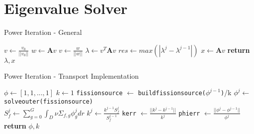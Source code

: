 \section{Eigenvalue Solver}
\begin{algorithm}
\caption{Power Iteration - General}
\begin{algorithmic}
    \State $v \gets \frac{v_0}{||v_0||}$ 
     
        \State $w \gets \textbf{A}v$
        \State $v \gets \frac{w}{|| w||}$
        \State $\lambda \gets v^T\textbf{A}v$
        \State $res \gets max(|\lambda^j - \lambda^{j-1}|)$
    \EndWhile
    \State $x \gets \textbf{A}v$
    \State \textbf{return} $\lambda, x$
\end{algorithmic}
\end{algorithm}

\begin{algorithm}
\caption{Power Iteration - Transport Implementation}
\begin{algorithmic}
    \State $\phi \gets [1, 1, ..., 1] $ 
    \State $k \gets 1$
     
        \State \texttt{fission\textunderscore source} $\gets$ \texttt{build\textunderscore fission\textunderscore source($\phi^{j-1}$)}/k
        \State $\phi^j \gets$ \texttt{solve\textunderscore outer(fission\textunderscore source)} \\
        \State $S_f^j \gets \sum\limits_{g=0}^{G} \int_D \nu \Sigma_{f, g} \phi_g^jdr$
        \State $k^j \gets \frac{k^{j-1}S_f^j}{S_f^{j-1}}$
        \State \texttt{kerr} $\gets \frac{||k^j - k^{j-1}||}{k^j}$
        \State \texttt{phierr} $\gets \frac{||\phi^j - \phi^{j-1}||}{\phi^j}$
    \EndWhile
    \State \textbf{return} $\phi, k$
\end{algorithmic}
\end{algorithm}

